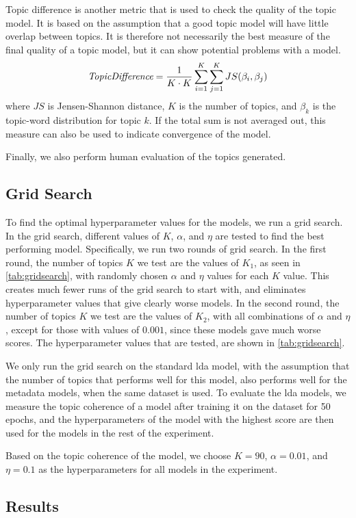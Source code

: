 Topic difference is another metric that is used to check the quality of the topic model.
It is based on the assumption that a good topic model will have little overlap between topics.
It is therefore not necessarily the best measure of the final quality of a topic model, but it can show potential problems with a model.
\begin{equation}
	\emph{TopicDifference} = \frac{1}{K \cdot K} \sum_{i=1}^{K} \sum_{j=1}^{K} JS(\beta_{i},\beta_{j})
\end{equation}
\noindent where $JS$ is Jensen-Shannon distance, $K$ is the number of topics, and $\beta_{k}$ is the topic-word distribution for topic $k$.
If the total sum is not averaged out, this measure can also be used to indicate convergence of the model.

Finally, we also perform human evaluation of the topics generated.

\subsection{Grid Search}\label{sec:experiment_gridsearch}
To find the optimal hyperparameter values for the models, we run a grid search.
In the grid search, different values of $K$, $\alpha$, and $\eta$ are tested to find the best performing model.
Specifically, we run two rounds of grid search.
In the first round, the number of topics $K$ we test are the values of $K_1$, as seen in \autoref{tab:gridsearch}, with randomly chosen $\alpha$ and $\eta$ values for each $K$ value.
This creates much fewer runs of the grid search to start with, and eliminates hyperparameter values that give clearly worse models.
In the second round, the number of topics $K$ we test are the values of $K_2$, with all combinations of $\alpha$ and $\eta$, except for those with values of $0.001$, since these models gave much worse scores.
The hyperparameter values that are tested, are shown in \autoref{tab:gridsearch}.

We only run the grid search on the standard \gls{lda} model, with the assumption that the number of topics that performs well for this model, also performs well for the metadata models, when the same dataset is used.
To evaluate the \gls{lda} models, we measure the topic coherence of a model after training it on the dataset for 50 epochs, and the hyperparameters of the model with the highest score are then used for the models in the rest of the experiment.

Based on the topic coherence of the model, we choose $K = 90$, $\alpha = 0.01$, and $\eta = 0.1$ as the hyperparameters for all models in the experiment.



\subsection{Results}\label{sec:results}


